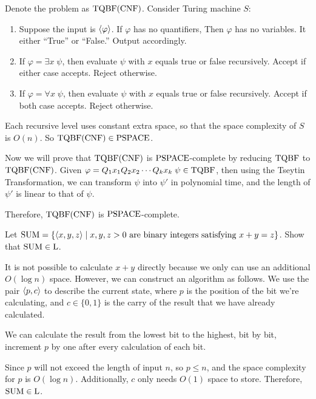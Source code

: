 \documentclass{homework}
\begin{document}
\begin{solution}

  Denote the problem as $\mathrm{TQBF}(\text{CNF})$. Consider Turing machine $S$:

  \begin{enumerate}
    \item Suppose the input is $\langle\varphi\rangle$. If $\varphi$ has no quantifiers,
          Then $\varphi$ has no variables. It either ``True'' or ``False.''
          Output accordingly.
    \item If $\varphi = \exists x\; \psi$, then evaluate $\psi$ with $x$
          equals true or false recursively. Accept if either case accepts.
          Reject otherwise.
    \item If $\varphi = \forall x\; \psi$, then evaluate $\psi$ with $x$
          equals true or false recursively. Accept if both case accepts.
          Reject otherwise.
  \end{enumerate}
  Each recursive level uses constant extra space, so that the space complexity
  of $S$ is $O(n)$. So $\mathrm{TQBF}(\text{CNF}) \in \textup{PSPACE}$.

  Now we will prove that $\mathrm{TQBF}(\text{CNF})$ is $\textup{PSPACE}$-complete by
  reducing $\mathrm{TQBF}$ to $\mathrm{TQBF}(\text{CNF})$.
  Given $\varphi = Q_1x_1Q_2x_2\cdots Q_kx_k\;\psi \in \mathrm{TQBF}$,
  then using the Tseytin Transformation,
  we can transform $\psi$ into $\psi'$ in polynomial time,
  and the length of $\psi'$ is linear to that of $\psi$.

  Therefore, $\mathrm{TQBF}(\text{CNF})$ is $\textup{PSPACE}$-complete.

\end{solution}

\begin{problem}
  Let $\mathrm{SUM} = \{ \langle x, y, z\rangle \mid x, y, z > 0 \text{ are binary
    integers satisfying } x+y=z \}$.
  Show that $\mathrm{SUM} \in \textup{L}$.
\end{problem}

\begin{solution}

  It is not possible to calculate $x + y$ directly because we only can use
  an additional $O(\log n)$ space.
  However, we can construct an algorithm as follows.
  We use the pair $\langle p, c\rangle$ to describe the current state,
  where $p$ is the position of the bit we're calculating,
  and $c \in \{0, 1\}$ is the carry of the result that we have already calculated.

  We can calculate the result from the lowest bit to the highest,
  bit by bit, increment $p$ by one after every calculation of each bit.

  Since $p$ will not exceed the length of input $n$,
  so $p \le n$, and the space complexity for $p$ is $O(\log n)$.
  Additionally, $c$ only needs $O(1)$ space to store.
  Therefore, $\mathrm{SUM} \in \textup{L}$.

\end{solution}
\end{document}
